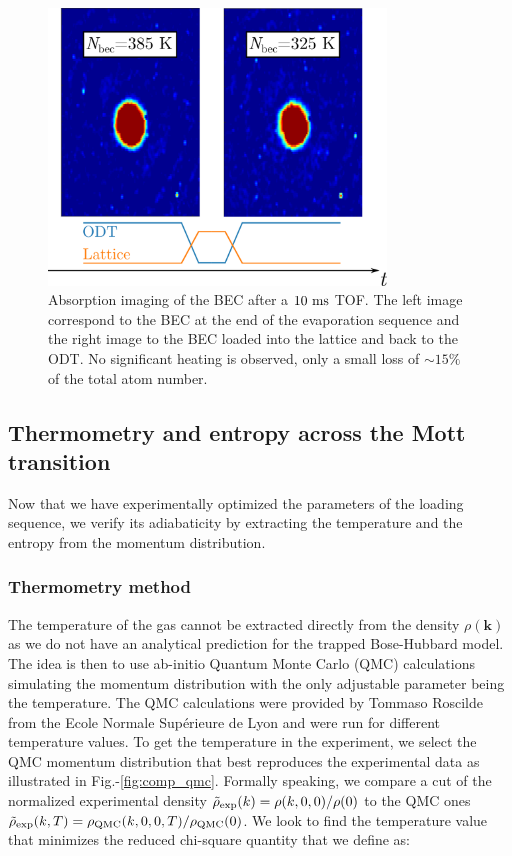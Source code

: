 \begin{figure}
    \centering
    \includegraphics[width=0.8\textwidth]{Fig/Chapter3/lattice_up_and_down.png}
    \caption[Characterisation of the lattice ramps]{Absorption imaging of the BEC after a $10 \ \rm{ms}$ TOF. The left image correspond to the BEC at the end of the evaporation sequence and the right image to the BEC loaded into the lattice and back to the ODT. No significant heating is observed, only a small loss of $\sim 15 \%$ of the total atom number.}
    \label{fig:lattice_up_and_down}
\end{figure}

\subsection{Thermometry and entropy across the Mott transition}

Now that we have experimentally optimized the parameters of the loading sequence, we verify its adiabaticity by extracting the temperature and the entropy from the momentum distribution.

\subsubsection{Thermometry method}

The temperature of the gas cannot be extracted directly from the density $\rho(\bm{k})$ as we do not have an analytical prediction for the trapped Bose-Hubbard model. The idea is then to use ab-initio Quantum Monte Carlo (QMC) calculations simulating the momentum distribution with the only adjustable parameter being the temperature. The QMC calculations were provided by Tommaso Roscilde from the Ecole Normale Supérieure de Lyon and were run for different temperature values. To get the temperature in the experiment, we select the QMC momentum distribution that best reproduces the experimental data  as illustrated in Fig.-\ref{fig:comp_qmc}. Formally speaking, we compare a cut of the normalized experimental density $\tilde{\rho}_{\rm{exp}}(k)=\rho(k,0,0)/\rho(0)$ to the QMC ones $\tilde{\rho}_{\rm{exp}}(k,T)=\rho_{\rm{QMC}}(k,0,0,T)/\rho_{\rm{QMC}}(0)$. We look to find the temperature value that minimizes the reduced chi-square quantity that we define as:

